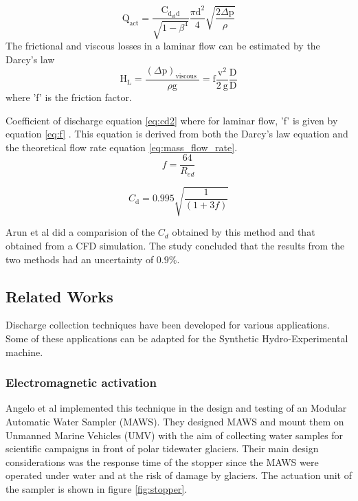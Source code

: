 \begin{equation}
\mathrm{Q}_{\mathrm{act}}=\frac{\mathrm{C}_{\mathrm{d}_{\mathrm{st}} \mathrm{d}}}{\sqrt{1-\beta^{4}}} \frac{\pi \mathrm{d}^{2}}{4} \sqrt{\frac{2 \Delta \mathrm{p}}{\rho}}
\end{equation}
The frictional and viscous losses in a laminar flow can be estimated by the Darcy's law
\begin{equation}
\mathrm{H}_{\mathrm{L}}=\frac{(\Delta \mathrm{p})_{\text {viscous }}}{\rho \mathrm{g}}=\mathrm{f} \frac{\mathrm{v}^{2}}{2 \mathrm{~g}} \frac{\mathrm{D}}{\mathrm{D}}
\end{equation}
where 'f' is the friction factor.
\par
Coefficient of discharge equation \ref{eq:cd2} where for laminar flow, 'f' is given by equation \ref{eq:f} . This equation is derived from both the Darcy's law equation and the theoretical flow rate equation \ref{eq:mass_flow_rate}.
\begin{equation}
f=\frac{64}{R_{e d}}
\label{eq:f}
\end{equation}


\begin{equation}
C_{\mathrm{d}}=0.995 \sqrt{\frac{1}{(1+3 f)}}
\label{eq:cd2}
\end{equation}

\par
Arun et al \cite{arun2015prediction} did  a comparision of the $C_{d}$ obtained by this method and that obtained from a CFD simulation. The study concluded that the results from the two methods had an uncertainty of $0.9\%$.
\subsection{Related Works}
Discharge collection techniques have been developed for various applications. Some of these applications can be adapted for the Synthetic Hydro-Experimental machine.

\subsubsection{Electromagnetic activation}
Angelo et al \cite{odetti2019design} implemented this technique in the design and testing of an Modular Automatic Water Sampler (MAWS). They designed MAWS and mount them on Unmanned Marine Vehicles (UMV) with the aim of collecting water samples for scientific campaigns in front of polar tidewater glaciers. Their main design considerations was the response time of the stopper since the MAWS were operated under water and at the risk of damage by glaciers. The actuation unit of the sampler is shown in figure \ref{fig:stopper}. 

